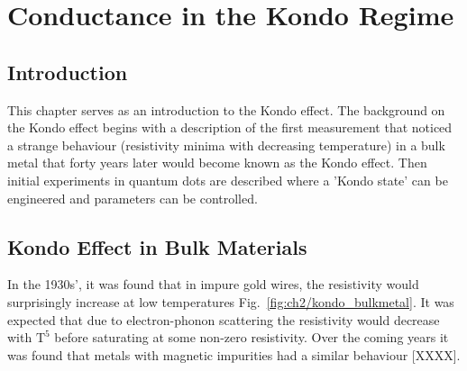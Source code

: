 \chapter{Conductance in the Kondo Regime}\label{cha:kondo_conductance}

\section{Introduction}
This chapter serves as an introduction to the Kondo effect. The background on the Kondo effect begins with a description of the first measurement that noticed a strange behaviour (resistivity minima with decreasing temperature) in a bulk metal that forty years later would become known as the Kondo effect. Then initial experiments in quantum dots are described where a 'Kondo state' can be engineered and parameters can be controlled. 

\afterpage{\clearpage}
\section{Kondo Effect in Bulk Materials}


In the 1930s', it was found that in impure gold wires, the resistivity would surprisingly increase at low temperatures Fig.~\ref{fig:ch2/kondo_bulkmetal}. It was expected that due to electron-phonon scattering the resistivity would decrease with $\mathrm{T^5}$ before saturating at some non-zero resistivity. Over the coming years it was found that metals with  magnetic impurities had a similar behaviour [XXXX].



